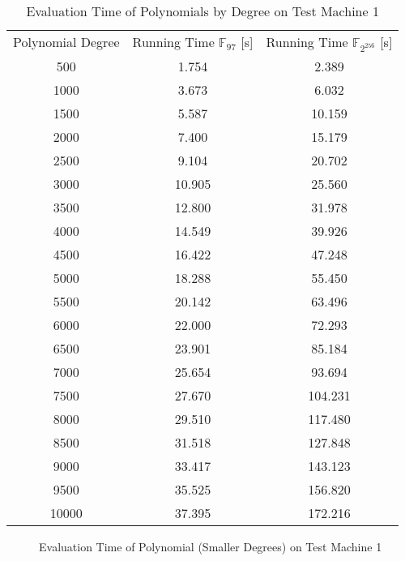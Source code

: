 \begin{table}[ht]
  \centering
  \begin{tabular}{|c|c|c|}
    Polynomial Degree & Running Time $\mathbb{F}_{97}$ [s] & Running Time
    $\mathbb{F}_{2^{256}}$ [s]\\
      500 &  1.754 &   2.389 \\
     1000 &  3.673 &   6.032 \\
     1500 &  5.587 &  10.159 \\
     2000 &  7.400 &  15.179 \\
     2500 &  9.104 &  20.702 \\
     3000 & 10.905 &  25.560 \\
     3500 & 12.800 &  31.978 \\
     4000 & 14.549 &  39.926 \\
     4500 & 16.422 &  47.248 \\
     5000 & 18.288 &  55.450 \\
     5500 & 20.142 &  63.496 \\
     6000 & 22.000 &  72.293 \\
     6500 & 23.901 &  85.184 \\
     7000 & 25.654 &  93.694 \\
     7500 & 27.670 & 104.231 \\
     8000 & 29.510 & 117.480 \\
     8500 & 31.518 & 127.848 \\
     9000 & 33.417 & 143.123 \\
     9500 & 35.525 & 156.820 \\
    10000 & 37.395 & 172.216 \\

  \end{tabular}
  \caption{Evaluation Time of Polynomials by Degree on Test Machine 1}
  \label{tab:poly-deg-t}
\end{table}

\begin{figure}[ht]
  \centering
  
  \caption{Evaluation Time of Polynomial
  (Smaller Degrees) on Test Machine 1}
  \label{fig:poly-deg-t-small}
\end{figure}

